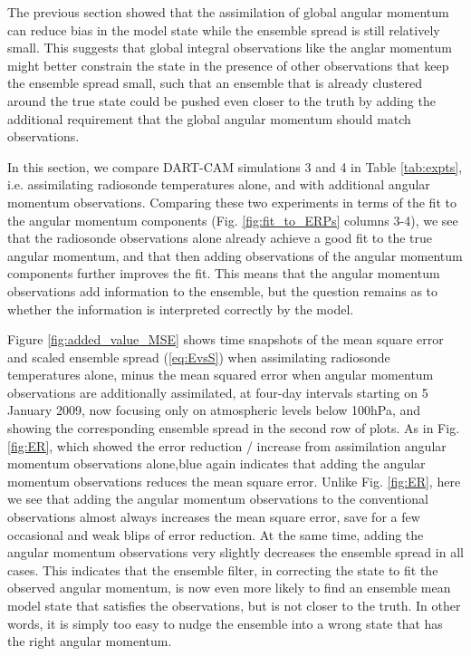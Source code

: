 

The previous section showed that the assimilation of global angular momentum can reduce bias in the model state while the ensemble spread is still relatively small.
This suggests that global integral observations like the anglar momentum might better constrain the state in the presence of other observations that keep the ensemble spread small, such that an ensemble that is already clustered around the true state could be pushed even closer to the truth by adding the additional requirement that the global angular momentum should match observations. 

In this section, we compare DART-CAM simulations 3 and 4 in Table \ref{tab:expts}, i.e. assimilating radiosonde temperatures alone, and with additional angular momentum observations.
Comparing these two experiments in terms of the fit to the angular momentum components (Fig. \ref{fig:fit_to_ERPs} columns 3-4), we see that the radiosonde observations alone already achieve a good fit to the true angular momentum, and that 
then adding observations of the angular momentum components further improves the fit.  
This means that the angular momentum observations add information to the ensemble, but the question remains as to whether the information is interpreted correctly by the model.

Figure \ref{fig:added_value_MSE} shows time snapshots of the mean square error and scaled ensemble spread (\ref{eq:EvsS}) when assimilating radiosonde temperatures alone, minus the mean squared error when angular momentum observations are additionally assimilated, at four-day intervals starting on 5 January 2009, now focusing only on atmospheric levels below 100hPa, and showing the corresponding ensemble spread in the second row of plots. 
As in Fig. \ref{fig:ER}, which showed the error reduction / increase from assimilation angular momentum observations alone,blue again indicates that adding the angular momentum observations reduces the mean square error. 
Unlike Fig. \ref{fig:ER}, here we see that adding the angular momentum observations to the conventional observations almost always increases the mean square error, save for a few occasional and weak blips of error reduction.  
At the same time, adding the angular momentum observations very slightly decreases the ensemble spread in all cases.
This indicates that the ensemble filter, in correcting the state to fit the observed angular momentum, is now even more likely to find an ensemble mean model state that satisfies the observations, but is not closer to the truth. 
In other words, it is simply too easy to nudge the ensemble into a wrong state that has the right angular momentum. 

